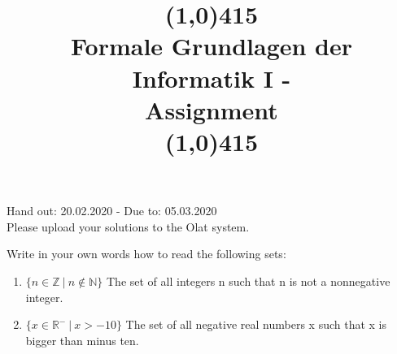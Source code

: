 \documentclass{exercise}
\title{ \line(1,0){415} \\ Formale Grundlagen der Informatik I -\\ Assignment \theexercise\\
\line(1,0){415}}
\begin{document}
\maketitle

\begin{center}
  Hand out: 20.02.2020 - Due to: 05.03.2020\\\vspace{1em}
  Please upload your solutions to the Olat system.\\
\end{center}


   Write in your own words how to read the following sets:
    \begin{enumerate}
      \item $\{ n \in \mathbb{Z} \: | \: n \notin \mathbb{N} \} $ \newline
      The set of all integers n such that n is not a nonnegative integer.
      
      \item $\{ x \in \mathbb{R}^{-} \: | \: x > -10 \} $
      \newline
      The set of all negative real numbers x such that x is bigger than minus ten.

    \end{enumerate}
\end{document}
